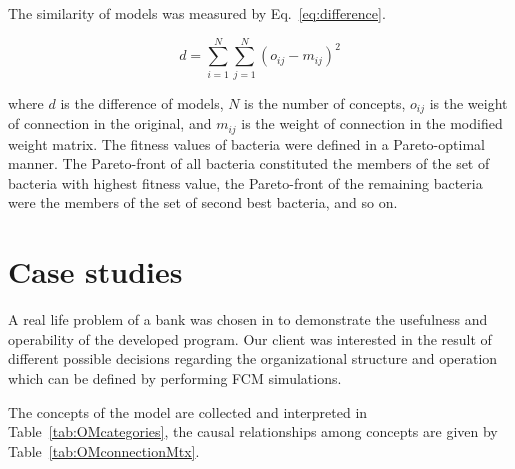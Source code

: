 \documentclass[graybox]{svmult}
\begin{document}
\noindent The similarity of models was measured by Eq.~\ref{eq:difference}.

\begin{equation}
  \label{eq:difference}
  d = \sum_{i=1}^{N} \sum_{j=1}^{N} (o_{ij} - m_{ij})^2
\end{equation}

\noindent where $d$ is the difference of models, $N$ is the number of 
concepts, $o_{ij}$ is the weight of connection in the original, and 
$m_{ij}$ is the weight of connection in the modified weight matrix. 
The fitness values of bacteria were defined in a Pareto-optimal 
manner. The Pareto-front of all bacteria constituted the members of the 
set of bacteria with highest fitness value, the Pareto-front of the 
remaining bacteria were the members of the set of second best bacteria, 
and so on.

\section{Case studies}
\label{sec:banking}

A real life problem of a bank was chosen in \cite
{hatwagner2018improved,hatwagner2019banking} to demonstrate the 
usefulness and operability of the developed program. Our client was interested in the result of different possible decisions regarding the organizational structure and operation which can be defined by performing FCM simulations. 

The concepts of the model are collected and interpreted in Table~\ref{tab:OMcategories}, the causal relationships among concepts are given by Table~\ref{tab:OMconnectionMtx}. 
\end{document}
